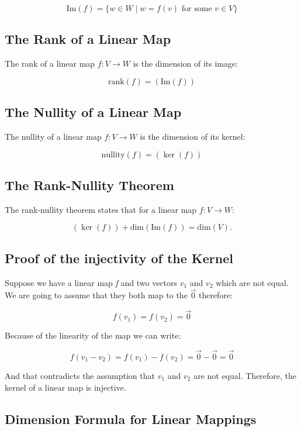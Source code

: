 \[
    \text{Im}(f) = \{ w \in W \mid w = f(v) \text{ for some } v \in V \}
\]
 
\subsection{The Rank of a Linear Map}

The rank of a linear map \( f: V \to W \) is the dimension of its image:

\[
    \text{rank}(f) = (\text{Im}(f))
\]

\subsection{The Nullity of a Linear Map}

The nullity of a linear map \( f: V \to W \) is the dimension of its kernel:
    
\[
    \text{nullity}(f) = (\ker(f))
    
\]

\subsection{The Rank-Nullity Theorem}

The rank-nullity theorem states that for a linear map \( f: V \to W \):

\[
    \text{}(\ker(f)) + \text{dim}(\text{Im}(f)) = \text{dim}(V).
\]

\subsection{Proof of the injectivity of the Kernel}

Suppose we have a linear map \emph{f} and two vectors \(v_1\) and \(v_2\) which are not equal. 
We are going to assume that they both map to the \(\vec{0}\) therefore:

\[
    f(v_1) = f(v_2) = \vec{0}
\]

Because of the linearity of the map we can write:

\[
    f(v_1 - v_2) = f(v_1) - f(v_2) = \vec{0} - \vec{0} = \vec{0}
\]

And that contradicts the assumption that \(v_1\) and \(v_2\) are not equal. Therefore, the 
kernel of a linear map is injective.

\subsection{Dimension Formula for Linear Mappings}

